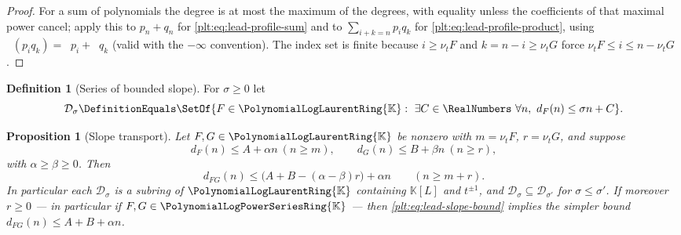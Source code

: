 \documentclass[11pt,oneside]{article}
\theoremstyle{plain}
\newtheorem{proposition}[theorem]{Proposition}
\theoremstyle{definition}
\newtheorem{definition}[theorem]{Definition}
\theoremstyle{remark}
\newcommand{\K}{\mathbb{K}}
\newcommand{\PLpow}{\PolynomialLogPowerSeriesRing{\K}}   %
\newcommand{\PLlau}{\PolynomialLogLaurentRing{\K}}       %
\newcommand{\ordt}{\nu_{t}}                              %
\DeclareMathOperator{\degL}{deg_{L}}
\newcommand{\dprofile}[1]{d_{#1}}                        %
\begin{document}
\begin{proof}
For a sum of polynomials the degree is at most the maximum of the degrees,
with equality unless the coefficients of that maximal power cancel; apply this
to \(p_n+q_n\) for \eqref{plt:eq:lead-profile-sum} and to
\(\sum_{i+k=n}p_iq_k\) for \eqref{plt:eq:lead-profile-product}, using
\(\degL(p_iq_k)=\degL p_i+\degL q_k\) (valid with the \(-\infty\) convention).
The index set is finite because \(i\ge\ordt F\) and \(k=n-i\ge\ordt G\) force
\(\ordt F\le i\le n-\ordt G\).
\end{proof}

\begin{definition}[Series of bounded slope]
\label{plt:def:lead-slope-class}
For \(\sigma\ge0\) let
\[
  \mathcal D_\sigma
  \DefinitionEquals
  \SetOf{F\in\PLlau:\ \exists C\in\RealNumbers\ \forall n,\
    \dprofile{F}(n)\le\sigma n+C}.
\]
\end{definition}

\begin{proposition}[Slope transport]
\label{plt:prop:lead-slope}
Let \(F,G\in\PLlau\) be nonzero with \(m=\ordt F\), \(r=\ordt G\), and suppose
\[
  \dprofile{F}(n)\le A+\alpha n\ (n\ge m),
  \qquad
  \dprofile{G}(n)\le B+\beta n\ (n\ge r),
\]
with \(\alpha\ge\beta\ge0\).  Then
\begin{equation}\label{plt:eq:lead-slope-bound}
  \dprofile{FG}(n)\le\bigl(A+B-(\alpha-\beta)r\bigr)+\alpha n
  \qquad(n\ge m+r).
\end{equation}
In particular each \(\mathcal D_\sigma\) is a subring of \(\PLlau\) containing
\(\K[L]\) and \(t^{\pm1}\), and
\(\mathcal D_\sigma\subseteq\mathcal D_{\sigma'}\) for \(\sigma\le\sigma'\).
If moreover \(r\ge0\) --- in particular if \(F,G\in\PLpow\) --- then
\eqref{plt:eq:lead-slope-bound} implies the simpler bound
\(\dprofile{FG}(n)\le A+B+\alpha n\).
\end{proposition}
\end{document}
